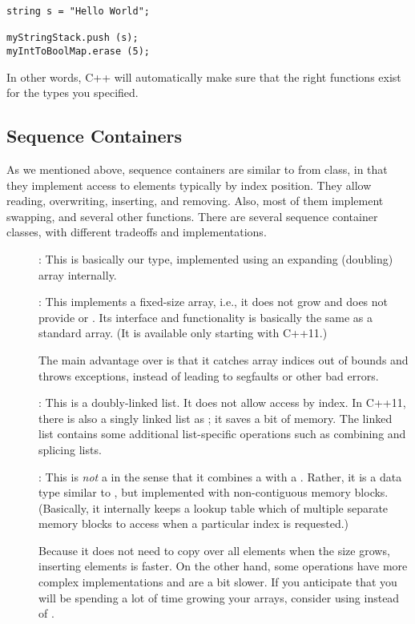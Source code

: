 \begin{verbatim}
string s = "Hello World";

myStringStack.push (s);
myIntToBoolMap.erase (5);
\end{verbatim}

In other words, C++ will automatically make sure that the right
functions exist for the types you specified.

\subsection{Sequence Containers}
As we mentioned above, sequence containers are
similar to  from class, in that they implement access to
elements typically by index position.
They allow reading, overwriting, inserting, and removing. 
Also, most of them implement swapping, and several other functions.
There are several sequence container classes, with different tradeoffs
and implementations.

\begin{description}
\item[]: This is basically our  type,
implemented using an expanding (doubling) array internally.

\item[]: This implements a fixed-size array,
i.e., it does not grow and does not provide  or . 
Its interface and functionality is basically the same as a standard array.
(It is available only starting with C++11.)

The main advantage over  is that it catches
array indices out of bounds and throws exceptions, instead of leading
to segfaults or other bad errors.
			
\item[]: This is a doubly-linked list. It does not allow
access by index. 
In C++11, there is also a singly linked list as ;
it saves a bit of memory.
The linked list contains some additional list-specific operations such
as combining and splicing lists.
			
\item[]: This is \emph{not} a  in the
sense that it combines a  with a .
Rather, it is a data type similar to , but implemented
with non-contiguous memory blocks. (Basically, it internally keeps a
lookup table which of multiple separate memory blocks to access when a
particular index is requested.)

Because it does not need to copy over all elements when the size
grows, inserting elements is faster.
On the other hand, some operations have more complex implementations
and are a bit slower. 
If you anticipate that you will be spending a lot of time growing your
arrays, consider using  instead of .
\end{description}
		
